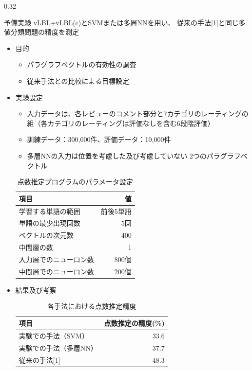 \documentclass[8pt,unicode]{beamer}
\newcommand{\columnscale}{0.32}
\newcommand{\tablefontsize}{\small}
\newcommand{\itemtitle}[1]{{\normalsize #1} \\}
\begin{document}
\begin{frame}{}
\begin{columns}[t]
\begin{column}{\columnscale\textwidth} %
  \begin{block}{予備実験}
    vLBL+vLBL(c)とSVMまたは多層NNを用い、
    従来の手法[1]と同じ多値分類問題の精度を測定

    \begin{itemize}
      \item \itemtitle{目的}
      \begin{itemize}
        \item パラグラフベクトルの有効性の調査
        \item 従来手法との比較による目標設定
      \end{itemize}

      \item \itemtitle{実験設定}
      \begin{itemize}
        \item 入力データは、各レビューのコメント部分と7カテゴリのレーティングの
        組（各カテゴリのレーティングは評価なしを含む6段階評価）
        \item 訓練データ：300,000件、評価データ：10,000件
        \item 多層NNの入力は位置を考慮した及び考慮していない
        2つのパラグラフベクトル
      \end{itemize}

      \begin{table}
        \tablefontsize
        \caption{点数推定プログラムのパラメータ設定}
        \label{table:parameters}
        \begin{tabular}{l | r}
          項目 & 値 \\
          \hline
          学習する単語の範囲 & 前後5単語 \\
          単語の最少出現回数 & 5回 \\
          ベクトルの次元数 & 400 \\
          中間層の数 & 1 \\
          入力層でのニューロン数 & 800個 \\
          中間層でのニューロン数 & 200個
        \end{tabular}
      \end{table}

      \item \itemtitle{結果及び考察}

        \begin{table}
          \tablefontsize
          \caption{各手法における点数推定精度}
          \begin{tabular}{l | r}
            項目 & 点数推定の精度(\%) \\
            \hline
            実験での手法（SVM）& 33.6 \\
            実験での手法（多層NN）& 37.7 \\
            従来の手法[1] & 48.3
          \end{tabular}
        \end{table}


\end{itemize}
\end{block}
\end{column}
\end{columns}
\end{frame}
\end{document}
